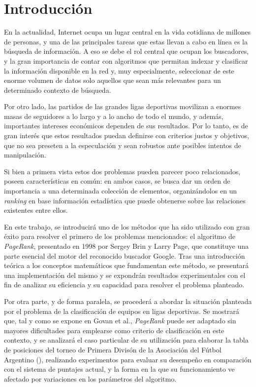\section{Introducción}

    En la actualidad, Internet ocupa un lugar central en la vida cotidiana de millones de personas, y una de las principales tareas que estas llevan a cabo en línea es la búsqueda de información. A eso se debe el rol central que ocupan los buscadores, y la gran importancia de contar con algoritmos que permitan indexar y clasificar la información disponible en la red y, muy especialmente, seleccionar de este enorme volumen de datos solo aquellos que sean más relevantes para un determinado contexto de búsqueda.

    Por otro lado, las partidos de las grandes ligas deportivas movilizan a enormes masas de seguidores a lo largo y a lo ancho de todo el mundo, y además, importantes intereses económicos dependen de sus resultados. Por lo tanto, es de gran interés que estos resultados puedan definirse con criterios justos y objetivos, que no sea preseten a la especulación y sean robustos ante posibles intentos de manipulación.

    Si bien a primera vista estos dos problemas pueden parecer poco relacionados, poseen características en común: en ambos casos, se busca dar un orden de importancia a una determinada colección de elementos, organizándolos en un \emph{ranking} en base información estadística que puede obtenerse sobre las relaciones existentes entre ellos.

    En este trabajo, se introducirá uno de los métodos que ha sido utilizado con gran éxito para resolver el primero de los problemas mencionados: el algoritmo de \emph{PageRank}, presentado en 1998 por Sergey Brin y Larry Page\cite{Brin1998}, que constituye una parte esencial del motor del reconocido buscador Google. Tras una introducción teórica a los conceptos matemáticos que fundamentan este método, se presentará una implementación del mismo y se expondrán resultados experimentales con el fin de analizar su eficiencia y su capacidad para resolver el problema planteado.

    Por otra parte, y de forma paralela, se procederá a abordar la situación planteada por el problema de la clasificación de equipos en ligas deportivas. Se mostrará que, tal y como se expone en Govan et al.\cite{Govan2008}, \emph{PageRank} puede ser adaptado sin mayores dificultades para emplearse como criterio de clasificación en este contexto, y se analizará el caso particular de su utilización para elaborar la tabla de posiciones del torneo de Primera Divisón de la Asociación del Fútbol Argentino (), realizando experimentos para evaluar su desempeño en comparación con el sistema de puntajes actual, y la forma en la que su funcionamiento ve afectado por variaciones en los parámetros del algoritmo.


        
